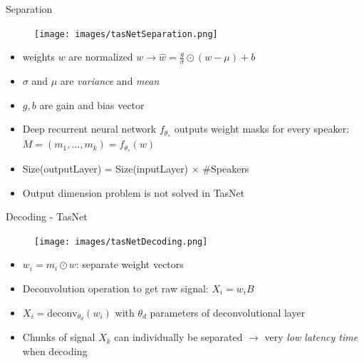 \documentclass[xcolor=table,mathserif,9pt]{beamer}    %
\begin{document}
\begin{frame}{Separation}

\begin{minipage}[t]{0.48\linewidth}
	\begin{figure}[htpb]
		\centering
		\texttt{[image: images/tasNetSeparation.png]}
	\end{figure}
\end{minipage}%
\hfill%
\begin{minipage}[t]{0.48\linewidth}
	\hfill
	\begin{itemize}
		\item weights $w$ are normalized $w \to \hat{w} = \frac{g}{\sigma} \odot (w - \mu) + b$ 
		\item $\sigma$ and $\mu$ are \emph{variance} and \emph{mean}
		\item $g,b$ are gain and bias vector
		\item Deep recurrent neural network $f_{\theta_s}$ outputs weight masks for every
			speaker: $M = (m_1, ...,m_k)  = f_{\theta_s}(w)$
		\item Size(outputLayer) = Size(inputLayer) $\times$ $\#$Speakers
		\item Output dimension problem is not solved in TasNet
	\end{itemize}
\end{minipage}	

\end{frame}

\begin{frame}{Decoding - TasNet}

\begin{minipage}[t]{0.48\linewidth}
	\begin{figure}[htpb]
		\centering
		\texttt{[image: images/tasNetDecoding.png]}
	\end{figure}
\end{minipage}%
\hfill%
\begin{minipage}[t]{0.48\linewidth}
	\hfill
	\begin{itemize}
		\item $w_i = m_i \odot w$: separate weight vectors
		\item Deconvolution operation to get raw signal: $X_i = w_iB$ 
		\item $X_i = \text{deconv}_{\theta_d}(w_i)$ with $\theta_d$
			parameters of deconvolutional layer 
		\item Chunks of signal $X_k$ can individually be separated $\to$ 
		      very \emph{low latency time} when decoding
	\end{itemize}
\end{minipage}	

\end{frame}
\end{document}

